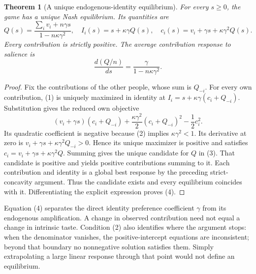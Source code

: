 \documentclass[11pt]{article}
\newtheorem{theorem}{Theorem}
\theoremstyle{definition}
\begin{document}
\begin{theorem}[A unique endogenous-identity equilibrium]
For every $s\geq0$, the game has a unique Nash equilibrium. Its quantities are
\[
 Q(s)=\frac{\sum_i v_i+n\gamma s}{1-n\kappa\gamma^2},
 \quad I_i(s)=s+\kappa\gamma Q(s),
 \quad c_i(s)=v_i+\gamma s+\kappa\gamma^2Q(s).
 \tag{3}
\]
Every contribution is strictly positive. The average contribution response to salience is
\[
 \frac{d(Q/n)}{ds}=\frac{\gamma}{1-n\kappa\gamma^2}.
 \tag{4}
\]
\end{theorem}
\begin{proof}
Fix the contributions of the other people, whose sum is $Q_{-i}$. For every own contribution, (1) is uniquely maximized in identity at $I_i=s+\kappa\gamma(c_i+Q_{-i})$. Substitution gives the reduced own objective
\[
 (v_i+\gamma s)(c_i+Q_{-i})
 +\frac{\kappa\gamma^2}{2}(c_i+Q_{-i})^2-\frac12c_i^2.
\]
Its quadratic coefficient is negative because (2) implies $\kappa\gamma^2<1$. Its derivative at zero is $v_i+\gamma s+\kappa\gamma^2Q_{-i}>0$. Hence its unique maximizer is positive and satisfies
$c_i=v_i+\gamma s+\kappa\gamma^2Q$. Summing gives the unique candidate for $Q$ in (3). That candidate is positive and yields positive contributions summing to it. Each contribution and identity is a global best response by the preceding strict-concavity argument. Thus the candidate exists and every equilibrium coincides with it. Differentiating the explicit expression proves (4).
\end{proof}

Equation (4) separates the direct identity preference coefficient $\gamma$ from its endogenous amplification. A change in observed contribution need not equal a change in intrinsic taste. Condition (2) also identifies where the argument stops: when the denominator vanishes, the positive-intercept equations are inconsistent; beyond that boundary no nonnegative solution satisfies them. Simply extrapolating a large linear response through that point would not define an equilibrium.
\end{document}
